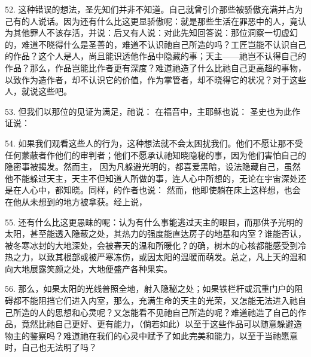 52. 这种错误的想法，圣先知们并非不知道。自己就曾引介那些被骄傲充满并占为己有的人说话。因为还有什么比这更显骄傲呢：就是那些生活在罪恶中的人，竟认为其他罪人不该存活，并说：后又有人说：对此先知回答说：那位洞察一切虚幻的，难道不晓得什么是圣善的，难道不认识祂自己所造的吗？工匠岂能不认识自己的作品？这个人是人，尚且能识透他作品中隐藏的事；天主——祂岂不认得自己的作品？那么，作品岂能比作者更有深度？难道祂造了什么比祂自己更高超的事物，以致作为造作者，却不认识它的价值，作为掌管者，却不晓得它的状况？对于这些人，就说这些吧。\par

53. 但我们以那位的见证为满足，祂说： 在福音中，主耶稣也说： 圣史也为此作证说：\par

54. 如果我们观看这些人的行为，这种想法就不会太困扰我们。他们不愿让那不受任何蒙蔽者作他们的审判者；他们不愿承认祂知晓隐秘的事，因为他们害怕自己的隐密事被揭发。然而主， 因为凡躲避光明的，都喜爱黑暗，设法隐藏自己，虽然他不能躲过天主，天主不但知道人所做的事，连人心中所想的，无论在宇宙深处还是在人心中，都知晓。同样，的作者也说： 然而，他即使躺在床上这样想，也会在他从未想到的地方被拿获。经上说，\par

55. 还有什么比这更愚昧的呢：认为有什么事能逃过天主的眼目，而那供予光明的太阳，甚至能透入隐蔽之处，其热力的强度能直达房子的地基和内室？谁能否认，被冬寒冰封的大地深处，会被春天的温和所暖化？的确，树木的心核都能感受到冷热之力，以致其根部或被严寒冻伤，或因太阳的温暖而萌发。总之，凡上天的温和向大地展露笑颜之处，大地便盛产各种果实。\par

56. 那么，如果太阳的光线普照全地，射入隐秘之处；如果铁栏杆或沉重门户的阻碍都不能阻挡它们进入内室，那么，充满生命的天主的光荣，又怎能无法进入祂自己所造的人的思想和心灵呢？又怎能看不见祂自己所造的呢？难道祂造了自己的作品，竟然比祂自己更好、更有能力，（倘若如此）以至于这些作品可以随意躲避造物主的鉴察吗？难道祂在我们的心灵中赋予了如此完美和能力，以至于当祂愿意时，自己也无法明了吗？\par

